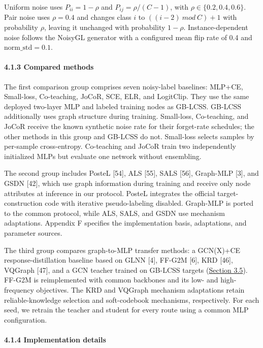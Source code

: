 Uniform noise uses \(P_{ii} = 1 - \rho\) and \(P_{ij} = \rho/(C - 1)\), with \(\rho \in \{ 0.2,0.4,0.6\}\). Pair noise uses \(\rho = 0.4\) and changes class \(i\) to \(((i - 2)\ mod\ C) + 1\) with probability \(\rho\), leaving it unchanged with probability \(1 - \rho\). Instance-dependent noise follows the NoisyGL generator with a configured mean flip rate of 0.4 and \(\text{norm\_std} = 0.1\).

\paragraph{4.1.3 Compared methods}\label{compared-methods}

The first comparison group comprises seven noisy-label baselines: MLP+CE, Small-loss, Co-teaching, JoCoR, SCE, ELR, and LogitClip. They use the same deployed two-layer MLP and labeled training nodes as GB-LCSS. GB-LCSS additionally uses graph structure during training. Small-loss, Co-teaching, and JoCoR receive the known synthetic noise rate for their forget-rate schedules; the other methods in this group and GB-LCSS do not. Small-loss selects samples by per-sample cross-entropy. Co-teaching and JoCoR train two independently initialized MLPs but evaluate one network without ensembling.

The second group includes PosteL {[}54{]}, ALS {[}55{]}, SALS {[}56{]}, Graph-MLP {[}3{]}, and GSDN {[}42{]}, which use graph information during training and receive only node attributes at inference in our protocol. PosteL integrates the official target-construction code with iterative pseudo-labeling disabled. Graph-MLP is ported to the common protocol, while ALS, SALS, and GSDN use mechanism adaptations. Appendix F specifies the implementation basis, adaptations, and parameter sources.

The third group compares graph-to-MLP transfer methods: a GCN(X)+CE response-distillation baseline based on GLNN {[}4{]}, FF-G2M {[}6{]}, KRD {[}46{]}, VQGraph {[}47{]}, and a GCN teacher trained on GB-LCSS targets (\hyperref[graph-teacher-distillation-extension]{Section 3.5}). FF-G2M is reimplemented with common backbones and its low- and high-frequency objectives. The KRD and VQGraph mechanism adaptations retain reliable-knowledge selection and soft-codebook mechanisms, respectively. For each seed, we retrain the teacher and student for every route using a common MLP configuration.

\paragraph{4.1.4 Implementation details}\label{implementation-details}

